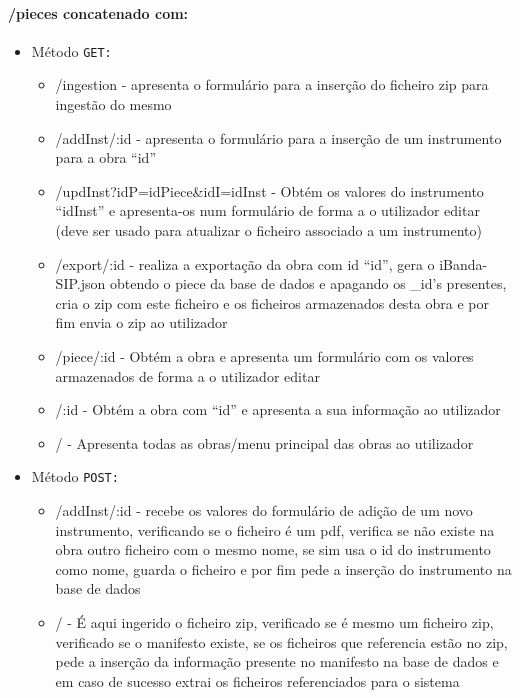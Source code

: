 \paragraph{/pieces concatenado com:}
        \begin{itemize}
            \item Método \texttt{GET:}
                \begin{itemize}
                    \item /ingestion - apresenta o formulário para a inserção do ficheiro zip para ingestão do mesmo
                    \item /addInst/:id - apresenta o formulário para a inserção de um instrumento para a obra ``id''
                    \item /updInst?idP=idPiece\&idI=idInst - Obtém os valores do instrumento ``idInst'' e apresenta-os num formulário de forma a o utilizador editar (deve ser usado para atualizar o ficheiro associado a um instrumento)
                    \item /export/:id - realiza a exportação da obra com id ``id'', gera o iBanda-SIP.json obtendo o piece da base de dados e apagando os \_id's presentes, cria o zip com este ficheiro e os ficheiros armazenados desta obra e por fim envia o zip ao utilizador
                    \item /piece/:id - Obtém a obra e apresenta um formulário com os valores armazenados de forma a o utilizador editar
                    \item /:id - Obtém a obra com ``id'' e apresenta a sua informação ao utilizador
                    \item / - Apresenta todas as obras/menu principal das obras ao utilizador
                \end{itemize}
            \item Método \texttt{POST:}
                \begin{itemize}
                    \item /addInst/:id - recebe os valores do formulário de adição de um novo instrumento, verificando se o ficheiro é um pdf, verifica se não existe na obra outro ficheiro com o mesmo nome, se sim usa o id do instrumento como nome, guarda o ficheiro e por fim pede a inserção do instrumento na base de dados
                    \item / - É aqui ingerido o ficheiro zip, verificado se é mesmo um ficheiro zip, verificado se o manifesto existe, se os ficheiros que referencia estão no zip, pede a inserção da informação presente no manifesto na base de dados e em caso de sucesso extrai os ficheiros referenciados para o sistema

\end{itemize}
\end{itemize}
